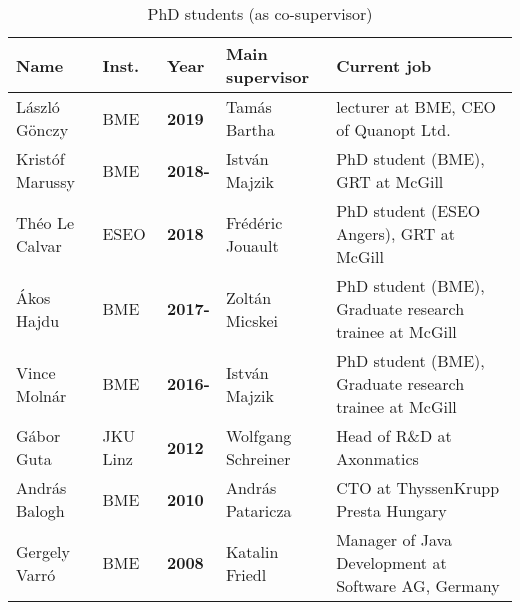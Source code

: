 \begin{table}[htb]
\footnotesize
\begin{tabular}{@{}llllp{8cm}@{}}
\toprule
\textbf{Name} & \textbf{Inst.} & \textbf{Year} & \textbf{Main supervisor} & \textbf{Current job} \\ \midrule
L\'aszl\'o G\"onczy & BME & \textbf{2019}  & Tam\'as Bartha & lecturer at BME, CEO of Quanopt Ltd.\\
Krist\'of Marussy & BME & \textbf{2018-}  & Istv\'an Majzik & PhD student (BME), GRT at McGill \\
Th\'eo Le Calvar & ESEO & \textbf{2018}  & Fr\'ed\'eric Jouault & PhD student (ESEO Angers), GRT at McGill \\
\'Akos Hajdu & BME & \textbf{2017-}  & Zolt\'an Micskei & PhD student (BME), Graduate research trainee at McGill \\
Vince Moln\'ar & BME & \textbf{2016-}  & Istv\'an Majzik & PhD student (BME), Graduate research trainee at McGill \\
G\'abor Guta & JKU Linz & \textbf{2012}  & Wolfgang Schreiner & Head of R\&D at Axonmatics \\
Andr\'as Balogh & BME & \textbf{2010}  & Andr\'as Pataricza & CTO at ThyssenKrupp Presta Hungary \\
Gergely Varr\'o & BME & \textbf{2008}  & Katalin Friedl & Manager of Java Development at Software AG, Germany \\ \bottomrule
\end{tabular}
\caption{PhD students (as co-supervisor)}
\label{tab:phd-cosupervised}
\end{table}

